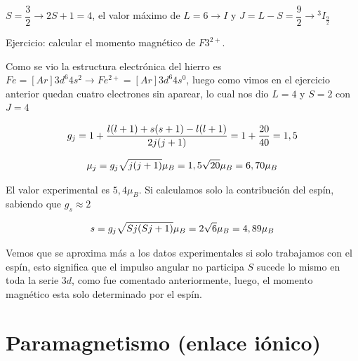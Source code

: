 $S=\dfrac{3}{2}\rightarrow 2S+1=4$, el valor máximo de $L=6 \rightarrow I$ y $J=L-S=\dfrac{9}{2}\rightarrow {^{3}}I_{\frac{9}{2}}$

Ejercicio: calcular el momento magnético de $F3^{2+}$.

Como se vio la estructura electrónica del hierro es $Fe = [Ar]3d^{6}4s^{2} \rightarrow Fe^{2+}=[Ar]3d^{6}4s^{0}$, luego como vimos en el ejercicio anterior quedan cuatro electrones sin aparear, lo cual nos dio $L=4$ y $S=2$ con $J=4$

\begin{equation*}
	g_{j}= 1 +\dfrac{l(l + 1)+s(s + 1)-l(l + 1)}{2j(j + 1)}=1+\dfrac{20}{40}=1,5
\end{equation*}

\begin{equation*}
	\mu_{j}= g_{j}\sqrt{j(j + 1)}\mu_{B}=1,5\sqrt{20}\mu_{B}=6,70\mu_{B}
\end{equation*}


El valor experimental es $5,4 \mu_{B}$. Si calculamos solo la contribución del espín, sabiendo que $g_{s}\approx 2$

\begin{equation*}
	s= g_{j}\sqrt{Sj(Sj + 1)}\mu_{B}=2\sqrt{6}\mu_{B}=4,89\mu_{B}
\end{equation*}


Vemos que se aproxima más a los datos experimentales si solo trabajamos con el espín, esto significa que el impulso angular no participa $S$ sucede lo mismo en toda la serie $3d$, como fue comentado anteriormente, luego, el momento magnético esta solo determinado por el espín.


\section{Paramagnetismo (enlace iónico)}

